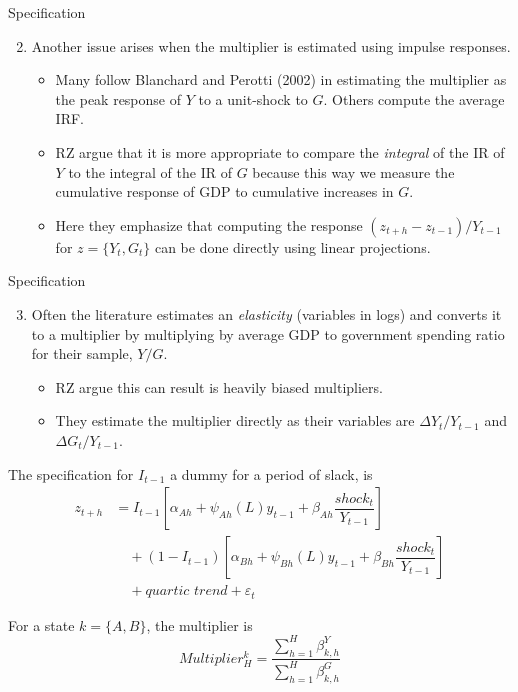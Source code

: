 \documentclass{beamer}
\begin{document}
\begin{frame}{Specification}
  \begin{enumerate}
    \setcounter{enumi}{1}
      \item Another issue arises when the multiplier is estimated using impulse responses.
      \begin{itemize}
        \item Many follow Blanchard and Perotti (2002) in estimating the multiplier as the peak response of $Y$ to a unit-shock to $G$. Others compute the average IRF.

        \item RZ argue that it is more appropriate to compare the \textit{integral} of the IR of $Y$ to the integral of the IR of $G$ because this way we measure the cumulative response of GDP to cumulative increases in $G$.

        \item Here they emphasize that computing the response $(z_{t + h} - z_{t - 1}) / Y_{t - 1}$ for $z = \{Y_t, G_t\}$ can be done directly using linear projections.
      \end{itemize}
  \end{enumerate}
\end{frame}

\begin{frame}{Specification}
  \begin{enumerate}
    \setcounter{enumi}{2}
    \item Often the literature estimates an \textit{elasticity} (variables in logs) and converts it to a multiplier by multiplying by average GDP to government spending ratio for their sample, $Y / G$.
      \begin{itemize}
        \item RZ argue this can result is heavily biased multipliers.

        \item They estimate the multiplier directly as their variables are $\Delta Y_t / Y_{t - 1}$ and $\Delta G_t / Y_{t - 1}$.
      \end{itemize}
  \end{enumerate}

  The specification for $I_{t - 1}$ a dummy for a period of slack, is
  \begin{align*}
    z_{t + h}
    & = I_{t - 1} \left[
      \alpha_{Ah}
      + \psi_{Ah}(L) y_{t - 1}
      + \beta_{Ah} \dfrac{shock_t}{Y_{t - 1}}
    \right] \\
    & \quad
    + (1 - I_{t - 1}) \left[
      \alpha_{Bh}
      + \psi_{Bh}(L) y_{t - 1}
      + \beta_{Bh} \dfrac{shock_t}{Y_{t - 1}}
    \right] \\
    & \quad
    + \textit{quartic trend}
    + \varepsilon_t
  \end{align*}

  For a state $k = \{A, B\}$, the multiplier is
  \[
    Multiplier_H^k
    = \dfrac{\sum^{H}_{h = 1} \beta_{k, h}^Y}{\sum^{H}_{h = 1} \beta_{k, h}^G}
  \]

\end{frame}
\end{document}
